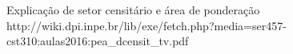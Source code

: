 Explicação de setor censitário e área de ponderação
http://wiki.dpi.inpe.br/lib/exe/fetch.php?media=ser457-cst310:aulas2016:pea_dcensit_tv.pdf

